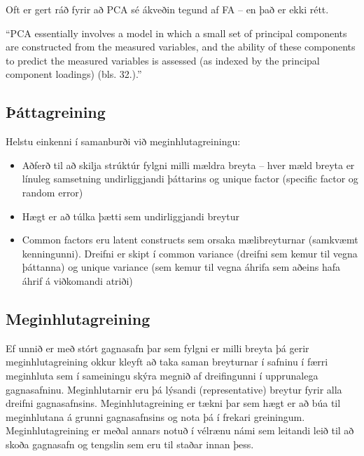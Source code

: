 \documentclass[]{book}
\begin{document}
Oft er gert ráð fyrir að PCA sé ákveðin tegund af FA -- en það er ekki rétt.

``PCA essentially involves a model in which a small set of principal components are constructed from the measured variables, and the ability of these components to predict the measured variables is assessed (as indexed by the principal component loadings) (bls. 32.).''

\hypertarget{uxfeuxe1ttagreining-1}{%
\subsection{Þáttagreining}\label{uxfeuxe1ttagreining-1}}

Helstu einkenni í samanburði við meginhlutagreiningu:

\begin{itemize}
\item
  Aðferð til að skilja strúktúr fylgni milli mældra breyta -- hver mæld breyta er línuleg samsetning undirliggjandi þáttarins og unique factor (specific factor og random error)
\item
  Hægt er að túlka þætti sem undirliggjandi breytur
\item
  Common factors eru latent constructs sem orsaka mælibreyturnar (samkvæmt kenningunni). Dreifni er skipt í common variance (dreifni sem kemur til vegna þáttanna) og unique variance (sem kemur til vegna áhrifa sem aðeins hafa áhrif á viðkomandi atriði)
\end{itemize}

\hypertarget{meginhlutagreining}{%
\subsection{Meginhlutagreining}\label{meginhlutagreining}}

Ef unnið er með stórt gagnasafn þar sem fylgni er milli breyta þá gerir meginhlutagreining okkur kleyft að taka saman breyturnar í safninu í færri meginhluta sem í sameiningu skýra megnið af dreifingunni í upprunalega gagnasafninu. Meginhlutarnir eru þá lýsandi (representative) breytur fyrir alla dreifni gagnasafnsins. Meginhlutagreining er tækni þar sem hægt er að búa til meginhlutana á grunni gagnasafnsins og nota þá í frekari greiningum. Meginhlutagreining er meðal annars notuð í vélrænu námi sem leitandi leið til að skoða gagnasafn og tengslin sem eru til staðar innan þess.
\end{document}
